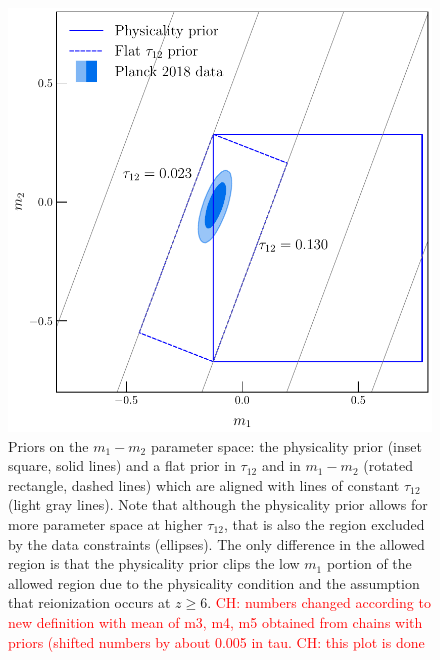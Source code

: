 \documentclass[prd,twocolumn,amsmath,amssymb,floatfix,superscriptaddress,nofootinbib]{revtex4-1}
\newcommand{\ch}[1]{\textcolor{red}{#1}}
\begin{document}
{ \begin{figure}
          \includegraphics[width=0.9\columnwidth]{paper/plots/pl18_pc_zmax30_pliklite_srollv2_1015_plot_rotated_box_flat_tau12.pdf}
          \caption {Priors on the $m_1-m_2$ parameter space: the physicality prior (inset square, solid lines) and a flat prior in
           $\tau_{12}$ and in $m_1-m_2$ (rotated rectangle, dashed lines) 
           which are aligned with lines of constant $\tau_{12}$ (light gray lines). Note that although the physicality prior allows for more parameter space at higher $\tau_{12}$, that is also the region excluded by the data constraints (ellipses). The only difference in the allowed region is that the physicality prior clips the low $m_1$ portion of the allowed region due to the physicality condition and the assumption that reionization occurs at $z\ge 6$. \ch{CH: numbers changed according to new definition with mean of m3, m4, m5 obtained from chains with priors (shifted numbers by about 0.005 in tau.} \ch{CH: this plot is done}} 
          \label{fig:prior_box}
\end{figure}

}
\end{document}
